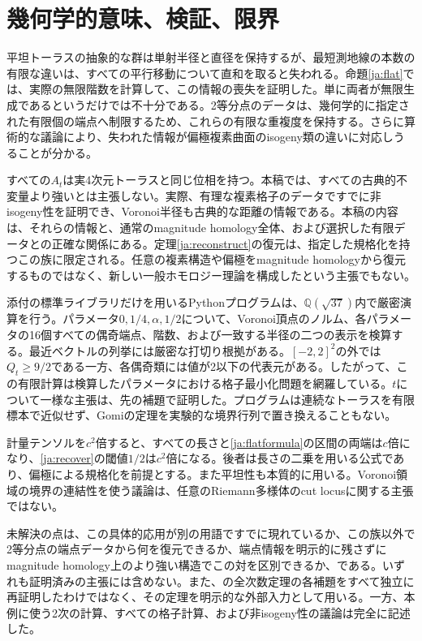 \documentclass[12pt]{amsart}
\theoremstyle{definition}
\theoremstyle{remark}
\numberwithin{equation}{section}
\newcommand{\Q}{\mathbb{Q}}
\begin{document}
\section{幾何学的意味、検証、限界}
平坦トーラスの抽象的な群は単射半径と直径を保持するが、最短測地線の本数の有限な違いは、すべての平行移動について直和を取ると失われる。命題\ref{ja:flat}では、実際の無限階数を計算して、この情報の喪失を証明した。単に両者が無限生成であるというだけでは不十分である。2等分点のデータは、幾何学的に指定された有限個の端点へ制限するため、これらの有限な重複度を保持する。さらに算術的な議論により、失われた情報が偏極複素曲面のisogeny類の違いに対応しうることが分かる。

すべての$A_t$は実4次元トーラスと同じ位相を持つ。本稿では、すべての古典的不変量より強いとは主張しない。実際、有理な複素格子のデータですでに非isogeny性を証明でき、Voronoi半径も古典的な距離の情報である。本稿の内容は、それらの情報と、通常のmagnitude homology全体、および選択した有限データとの正確な関係にある。定理\ref{ja:reconstruct}の復元は、指定した規格化を持つこの族に限定される。任意の複素構造や偏極をmagnitude homologyから復元するものではなく、新しい一般ホモロジー理論を構成したという主張でもない。

添付の標準ライブラリだけを用いるPythonプログラムは、$\Q(\sqrt{37})$内で厳密演算を行う。パラメータ$0,1/4,\alpha,1/2$について、Voronoi頂点のノルム、各パラメータの16個すべての偶奇端点、階数、および一致する半径の二つの表示を検算する。最近ベクトルの列挙には厳密な打切り根拠がある。$[-2,2]^2$の外では$Q_t\geq9/2$である一方、各偶奇類には値が2以下の代表元がある。したがって、この有限計算は検算したパラメータにおける格子最小化問題を網羅している。$t$について一様な主張は、先の補題で証明した。プログラムは連続なトーラスを有限標本で近似せず、Gomiの定理を実験的な境界行列で置き換えることもない。

計量テンソルを$c^2$倍すると、すべての長さと\eqref{ja:flatformula}の区間の両端は$c$倍になり、\eqref{ja:recover}の閾値$1/2$は$c^2$倍になる。後者は長さの二乗を用いる公式であり、偏極による規格化を前提とする。また平坦性も本質的に用いる。Voronoi領域の境界の連結性を使う議論は、任意のRiemann多様体のcut locusに関する主張ではない。

未解決の点は、この具体的応用が別の用語ですでに現れているか、この族以外で2等分点の端点データから何を復元できるか、端点情報を明示的に残さずにmagnitude homology上のより強い構造でこの対を区別できるか、である。いずれも証明済みの主張には含めない。また、\cite{ja:G}の全次数定理の各補題をすべて独立に再証明したわけではなく、その定理を明示的な外部入力として用いる。一方、本例に使う2次の計算、すべての格子計算、および非isogeny性の議論は完全に記述した。
\end{document}
